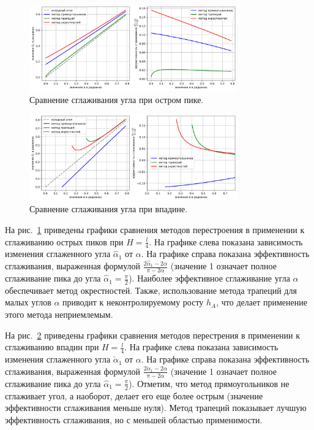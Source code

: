 \documentclass[a4paper,14pt]{extarticle}                     %
\theoremstyle{plain}                                         %
\begin{document}
\begin{figure}[ht]
\centering
\includegraphics[width=0.8\textwidth]{./pics/text_1_remesh_2d/peak-methods-chart.png}
\singlespacing
\caption{Сравнение сглаживания угла при остром пике.}
\label{fig:text_1_remesh_2d_peak_methods_chart}
\end{figure}

\begin{figure}[!ht]
\centering
\includegraphics[width=0.8\textwidth]{./pics/text_1_remesh_2d/cavern-methods-chart.png}
\singlespacing
\caption{Сравнение сглаживания угла при впадине.}
\label{fig:text_1_remesh_2d_cavern_methods_chart}
\end{figure}

На рис.~\ref{fig:text_1_remesh_2d_peak_methods_chart} приведены графики сравнения методов перестроения в применении к сглаживанию острых пиков при $H = \frac{l}{4}$.
На графике слева показана зависимость изменения сглаженного угла $\hat{\alpha}_1$ от $\alpha$.
На графике справа показана эффективность сглаживания, выраженная формулой $\frac{2 \hat{\alpha}_1 - 2 \alpha}{\pi - 2 \alpha}$ (значение 1 означает полное сглаживание пика до угла $\hat{\alpha}_1 = \frac{\pi}{2}$).
Наиболее эффективное сглаживание угла $\alpha$ обеспечивает метод окрестностей.
Также, использование метода трапеций для малых углов $\alpha$ приводит к неконтролируемому росту $h_A$, что делает применение этого метода неприемлемым.

На рис.~\ref{fig:text_1_remesh_2d_cavern_methods_chart} приведены графики сравнения методов перестрения в применении к сглаживанию впадин при $H = \frac{l}{4}$.
На графике слева показана зависимость изменения сглаженного угла $\check{\alpha}_1$ от $\alpha$.
На графике справа показана эффективность сглаживания, выраженная формулой $\frac{2 \check{\alpha}_1 - 2 \alpha}{\pi - 2 \alpha}$ (значение 1 означает полное сглаживание пика до угла $\hat{\alpha}_1 = \frac{\pi}{2}$).
Отметим, что метод прямоугольников не сглаживает угол, а наоборот, делает его еще более острым (значение эффективности сглаживания меньше нуля).
Метод трапеций показывает лучшую эффективность сглаживания, но с меньшей областью применимости.
\end{document}
